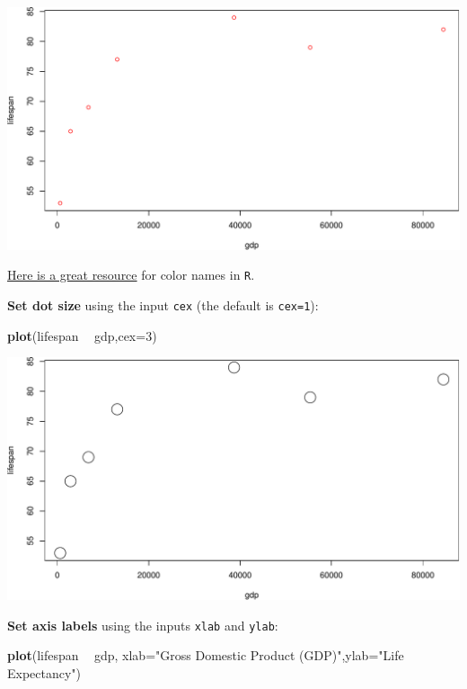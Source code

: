 \documentclass[
]{book}
\newenvironment{Shaded}{\begin{snugshade}}{\end{snugshade}}
\newcommand{\DataTypeTok}[1]{\textcolor[rgb]{0.13,0.29,0.53}{#1}}
\newcommand{\DecValTok}[1]{\textcolor[rgb]{0.00,0.00,0.81}{#1}}
\newcommand{\KeywordTok}[1]{\textcolor[rgb]{0.13,0.29,0.53}{\textbf{#1}}}
\newcommand{\NormalTok}[1]{#1}
\newcommand{\OperatorTok}[1]{\textcolor[rgb]{0.81,0.36,0.00}{\textbf{#1}}}
\newcommand{\StringTok}[1]{\textcolor[rgb]{0.31,0.60,0.02}{#1}}
\begin{document}
\includegraphics{figures/unnamed-chunk-104-1.pdf}

\href{http://www.stat.columbia.edu/~tzheng/files/Rcolor.pdf?utm_source=twitterfeed\&utm_medium=twitter}{Here is a great resource} for color names in \texttt{R}.

\textbf{Set dot size} using the input \texttt{cex} (the default is \texttt{cex=1}):

\begin{Shaded}
\begin{Highlighting}[]
\KeywordTok{plot}\NormalTok{(lifespan }\OperatorTok{~}\StringTok{ }\NormalTok{gdp,}\DataTypeTok{cex=}\DecValTok{3}\NormalTok{)}
\end{Highlighting}
\end{Shaded}

\includegraphics{figures/unnamed-chunk-105-1.pdf}

\textbf{Set axis labels} using the inputs \texttt{xlab} and \texttt{ylab}:

\begin{Shaded}
\begin{Highlighting}[]
\KeywordTok{plot}\NormalTok{(lifespan }\OperatorTok{~}\StringTok{ }\NormalTok{gdp, }\DataTypeTok{xlab=}\StringTok{"Gross Domestic Product (GDP)"}\NormalTok{,}\DataTypeTok{ylab=}\StringTok{"Life Expectancy"}\NormalTok{)}
\end{Highlighting}
\end{Shaded}
\end{document}
